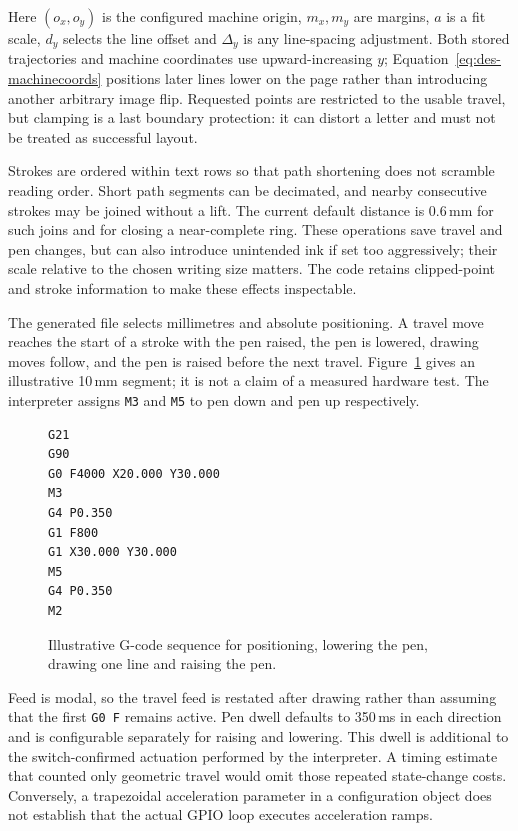 Here $(o_x,o_y)$ is the configured machine origin, $m_x,m_y$ are margins, $a$ is a fit scale, $d_y$ selects the line offset and $\Delta_y$ is any line-spacing adjustment. Both stored trajectories and machine coordinates use upward-increasing $y$; Equation~\ref{eq:des-machinecoords} positions later lines lower on the page rather than introducing another arbitrary image flip. Requested points are restricted to the usable travel, but clamping is a last boundary protection: it can distort a letter and must not be treated as successful layout.~\cite[style.py; synthesise.py; reproduce.py]{braunepipeline2026}

Strokes are ordered within text rows so that path shortening does not scramble reading order. Short path segments can be decimated, and nearby consecutive strokes may be joined without a lift. The current default distance is 0.6\,mm for such joins and for closing a near-complete ring. These operations save travel and pen changes, but can also introduce unintended ink if set too aggressively; their scale relative to the chosen writing size matters. The code retains clipped-point and stroke information to make these effects inspectable.~\cite[style.py; synthesise.py; reproduce.py]{braunepipeline2026}

The generated file selects millimetres and absolute positioning. A travel move reaches the start of a stroke with the pen raised, the pen is lowered, drawing moves follow, and the pen is raised before the next travel. Figure~\ref{fig:des-gcode-excerpt} gives an illustrative 10\,mm segment; it is not a claim of a measured hardware test. The interpreter assigns \texttt{M3} and \texttt{M5} to pen down and pen up respectively.~\cite[style.py; synthesise.py]{braunepipeline2026}


\begin{figure}[!htbp]
\begin{lstlisting}[style=designcode]
G21
G90
G0 F4000 X20.000 Y30.000
M3
G4 P0.350
G1 F800
G1 X30.000 Y30.000
M5
G4 P0.350
M2
\end{lstlisting}
\caption{Illustrative G-code sequence for positioning, lowering the pen, drawing one line and raising the pen.~\cite{brauneevidence2026,braunepipeline2026}}
\label{fig:des-gcode-excerpt}
\end{figure}

Feed is modal, so the travel feed is restated after drawing rather than assuming that the first \texttt{G0 F} remains active. Pen dwell defaults to 350\,ms in each direction and is configurable separately for raising and lowering. This dwell is additional to the switch-confirmed actuation performed by the interpreter. A timing estimate that counted only geometric travel would omit those repeated state-change costs. Conversely, a trapezoidal acceleration parameter in a configuration object does not establish that the actual GPIO loop executes acceleration ramps.~\cite[style.py; synthesise.py; reproduce.py]{braunepipeline2026}

